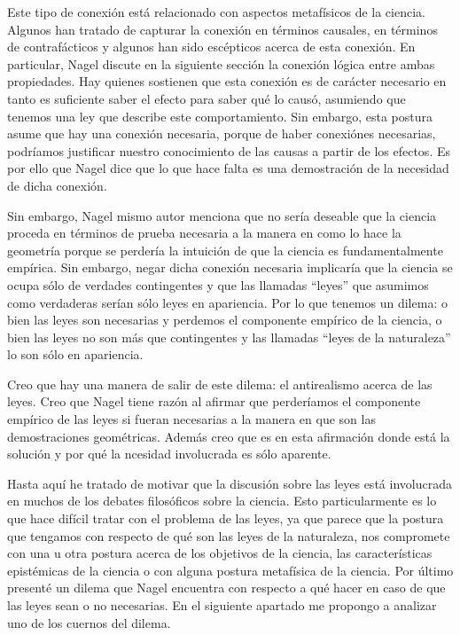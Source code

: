Este tipo de conexión está relacionado con aspectos metafísicos de la ciencia. Algunos han tratado de capturar la conexión en términos causales, en términos de contrafácticos y algunos han sido escépticos acerca de esta conexión. En particular, Nagel discute en la siguiente sección la conexión lógica entre ambas propiedades. Hay quienes sostienen que esta conexión es de carácter necesario en tanto es suficiente saber el efecto para saber qué lo causó, asumiendo que tenemos una ley que describe este comportamiento. Sin embargo, esta postura asume que hay una conexión necesaria, porque de haber conexiónes necesarias, podríamos justificar nuestro conocimiento de las causas a partir de los efectos. Es por ello que Nagel dice que lo que hace falta es una demostración de la necesidad de dicha conexión.

Sin embargo, Nagel mismo autor menciona que no sería deseable que la ciencia proceda en términos de prueba necesaria a la manera en como lo hace la geometría \cite[cfr., p. 53]{Nagel2006} porque se perdería la intuición de que la ciencia es fundamentalmente empírica. Sin embargo, negar dicha conexión necesaria implicaría que la ciencia se ocupa sólo de verdades contingentes  y que las llamadas ``leyes'' que asumimos como verdaderas serían sólo leyes en apariencia. Por lo que tenemos un dilema: o bien las leyes son necesarias y perdemos el componente empírico de la ciencia, o bien las leyes no son más que contingentes y las llamadas ``leyes de la naturaleza'' lo son sólo en apariencia.

Creo que hay una manera de salir de este dilema: el antirealismo acerca de las leyes. Creo que Nagel tiene razón al afirmar que perderíamos el componente empírico de las leyes si fueran necesarias a la manera en que son las demostraciones geométricas. Además creo que es en esta afirmación donde está la solución y por qué la ncesidad involucrada es sólo aparente.

Hasta aquí he tratado de motivar que la discusión sobre las leyes está involucrada en muchos de los debates filosóficos sobre la ciencia. Esto particularmente es lo que hace difícil tratar con el problema de las leyes, ya que parece que la postura que tengamos con respecto de qué son las leyes de la naturaleza, nos compromete con una u otra postura acerca de los objetivos de la ciencia, las características epistémicas de la ciencia o con alguna postura metafísica de la ciencia. Por último presenté un dilema que Nagel encuentra con respecto a qué hacer en caso de que las leyes sean o no necesarias. En el siguiente apartado me propongo a analizar uno de los cuernos del dilema.


